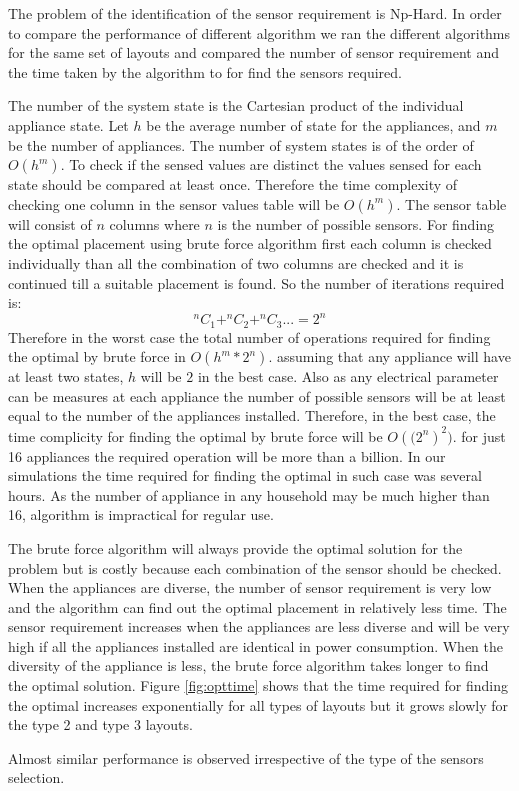 The problem of the identification of the sensor requirement is Np-Hard.  In order to compare the performance of different algorithm we ran the different algorithms for the same set of layouts and compared the number of sensor requirement and the time taken by the algorithm to for find the sensors required.

The number of the system state is the Cartesian product of the individual appliance state. Let $h$ be the average number of state for the appliances, and $m$ be the number of appliances. The number of system states is of the order of $O(h^m)$. To check if the sensed values are distinct the values sensed for each state should be compared at least once. Therefore the time complexity of checking one column in the sensor values table will be $O(h^m)$. The sensor table will consist of $n$ columns where $n$ is the number of possible sensors. For finding the optimal placement using brute force algorithm first each column is checked individually than all the combination of two columns are checked and it is continued till a suitable placement is found. So the number of iterations required is:
$$^ nC_1 + ^nC_2 + ^nC_3 ...  = 2^n $$
Therefore in the worst case the total number of operations required for finding the optimal by brute force in $O(h^m * 2^n)$. assuming that any appliance will have at least two states, $h$ will be $2$ in the best case.  Also as any electrical parameter can be measures at each appliance the number of possible sensors will be at least equal to the number of the appliances installed. Therefore, in the best case, the time complicity for finding the optimal by brute force will be  $O({(2^n})^2)$. for just 16 appliances the required operation will be more than a billion. In our simulations the time required for finding the optimal in such case was  several hours. As the number of appliance in any household may be much higher than 16, algorithm is impractical for regular use.

The brute force algorithm will always provide the optimal solution for the problem but is costly because each combination of the sensor should be checked. When the appliances are diverse, the number of sensor requirement is very low and the algorithm can find out the optimal placement in relatively less time. The sensor requirement increases when the appliances are less diverse and will be very high if all the appliances installed are identical in power consumption. When the diversity of the appliance is less, the brute force algorithm takes longer to find the optimal solution. Figure \ref{fig:opttime} shows that the time required for finding the optimal increases exponentially for all types of layouts but it grows slowly for the type 2 and type 3 layouts.

Almost similar performance is observed irrespective of the type of the sensors selection.
